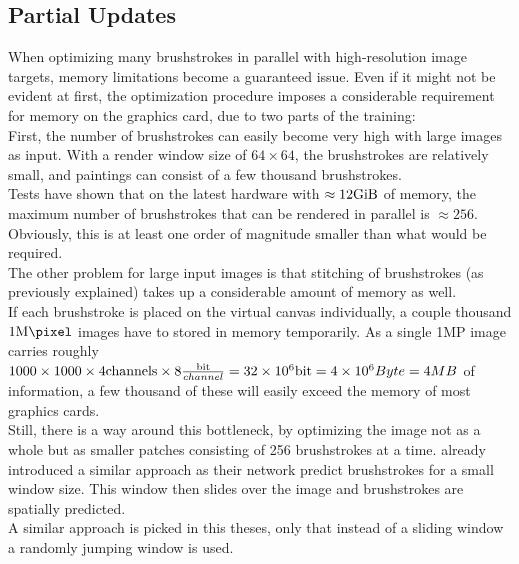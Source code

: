 \subsection{Partial Updates}
When optimizing many brushstrokes in parallel with high-resolution image targets, memory limitations become a guaranteed issue.
Even if it might not be evident at first, the optimization procedure imposes a considerable requirement for memory on the graphics card, due to two parts of the training:\\
First, the number of brushstrokes can easily become very high with large images as input.
With a render window size of $64\times64$, the brushstrokes are relatively small, and paintings can consist of a few thousand brushstrokes.\\
Tests have shown that on the latest hardware with $\approx 12 \si{\gibi\byte}$ of memory, the maximum number of brushstrokes that can be rendered in parallel is $\approx 256$.
Obviously, this is at least one order of magnitude smaller than what would be required.\\
The other problem for large input images is that stitching of brushstrokes (as previously explained) takes up a considerable amount of memory as well.\\
If each brushstroke is placed on the virtual canvas individually, a couple thousand $1\si{\mega\pixel}$ images have to stored in memory temporarily.
As a single 1MP image carries roughly $1000 \times 1000 \times 4 \text{channels} \times 8 \frac{\si{\bit}}{channel} = 32 \times 10^{6} \si{\bit} = 4 \times 10^{6} Byte = 4 MB$ of information, a few thousand of these will easily exceed the memory of most graphics cards.\\
Still, there is a way around this bottleneck, by optimizing the image not as a whole but as smaller patches consisting of 256 brushstrokes at a time.
\citeauthor*{paintbot} already introduced a similar approach as their network predict brushstrokes for a small window size.
This window then slides over the image and brushstrokes are spatially predicted.\\
A similar approach is picked in this theses, only that instead of a sliding window a randomly jumping window is used.\\
